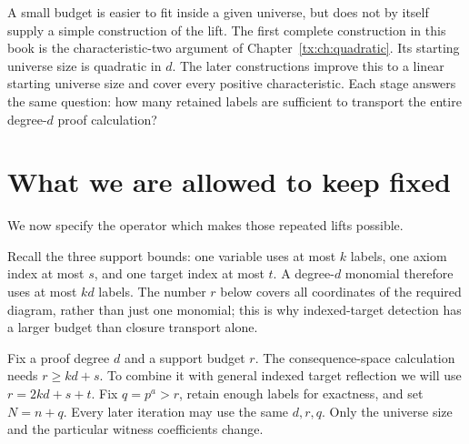 A small budget is easier to fit inside a given universe, but does not
by itself supply a simple construction of the lift. The first complete
construction in this book is the characteristic-two argument of
Chapter~\ref{tx:ch:quadratic}. Its starting universe size is quadratic in $d$.
The later constructions improve this to a linear starting universe size and
cover every positive characteristic. Each stage answers the same
question: how many retained labels are sufficient to transport the
entire degree-$d$ proof calculation?

\section{What we are allowed to keep fixed}
We now specify the operator which makes those repeated lifts possible.

Recall the three support bounds: one variable uses at most $k$ labels,
one axiom index at most $s$, and one target index at most $t$.
A degree-$d$ monomial therefore uses at most $kd$ labels. The number
$r$ below covers all coordinates of the required diagram, rather than
just one monomial; this is why indexed-target detection has a larger
budget than closure transport alone.

Fix a proof degree $d$ and a support budget $r$. The consequence-space
calculation needs $r\ge kd+s$. To combine it with general indexed target
reflection we will use $r=2kd+s+t$. Fix $q=p^a>r$, retain enough labels
for exactness, and set $N=n+q$. Every later iteration may use the same
$d,r,q$. Only the universe size and the particular witness coefficients
change.

